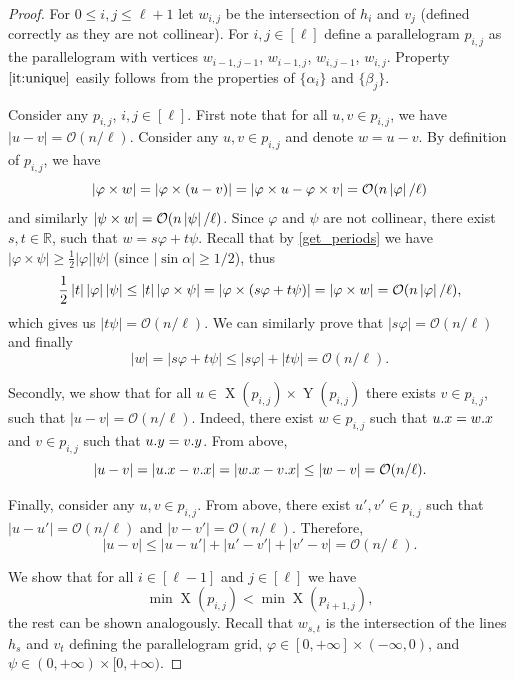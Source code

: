\documentclass[a4paper,11pt]{article}
\let\Cref\cref
\renewcommand{\O}{\mathcal{O}}
\renewcommand{\phi}{\varphi}
\DeclareMathOperator*{\X}{X}
\DeclareMathOperator*{\Y}{Y}
\newcommand{\absolute}[1]{\left\lvert#1\right\rvert}
\begin{document}
\begin{proof}
For $0 \le i,j \le \ell+1$ let $w_{i,j}$ be the intersection of $h_i$ and $v_j$ (defined correctly as they are not collinear). For $i,j \in [\ell]$ define a parallelogram $p_{i,j}$ as the parallelogram with vertices $w_{i-1,j-1}$, $w_{i-1,j}$, $w_{i,j-1}$, $w_{i,j}$. Property $\ref{it:unique}$ easily follows from the properties of $\{\alpha_i\}$ and $\{\beta_j\}$.

Consider any $p_{i,j}$, $i,j \in [\ell]$. First note that	for all $u, v \in p_{i, j}$, we have $\absolute{u - v} = \O(n / \ell)$. Consider any $u, v \in p_{i, j}$ and denote $w = u - v$.
By definition of $p_{i, j}$, we have
\[ \absolute{\h{w}} = \absolute{\h{(u - v)}} = \absolute{\h{u} - \h{v}} = \O(n\absolute{\phi} / \ell) \]
and similarly $\absolute{\s{w}} = \O(n\absolute{\psi} / \ell)$. Since $\phi$ and $\psi$ are not collinear, there exist $s, t \in \mathbb{R}$, such that $w = s\phi + t\psi$. Recall that by \Cref{get_periods} we have $\absolute{\phi \times \psi} \ge \frac{1}{2}\absolute{\phi}\absolute{\psi}$ (since $\absolute{\sin \alpha} \ge 1/2$), thus
\[ \frac{1}{2}\absolute{t}\absolute{\phi}\absolute{\psi} \le \absolute{t}\absolute{\phi \times \psi} = \absolute{\phi \times (s\phi + t\psi)} = \absolute{\h{w}} = \O(n\absolute{\phi} / \ell), \]
which gives us $\absolute{t\psi} = \O(n / \ell)$. We can similarly prove that $\absolute{s\phi} = \O(n / \ell)$ and finally 
\[ \absolute{w} = \absolute{s\phi + t\psi} \le \absolute{s\phi} + \absolute{t\psi} = \O(n / \ell). \]

Secondly, we show that	for all $u \in \X(p_{i, j}) \times \Y(p_{i, j})$ there exists $v \in p_{i, j}$, such that $\absolute{u - v} = \O(n / \ell)$. Indeed, there exist $w \in p_{i, j}$ such that $u.x = w.x$ and $v \in p_{i, j}$ such that $u.y = v.y$. From above, 
\[\absolute{u - v} = \absolute{\x{u} - \x{v}} = \absolute{\x{w} - \x{v}} \le \absolute{w - v} = \O(n / \ell).\] 

Finally, consider any $u, v \in p_{i, j}$. From above, there exist $u', v' \in p_{i, j}$ such that $\absolute{u - u'} = \O(n / \ell)$ and $\absolute{v - v'} = \O(n / \ell)$. Therefore, 
\[ \absolute{u - v} \le \absolute{u - u'} + \absolute{u' - v'} + \absolute{v' - v} = \O(n / \ell). \]

We show that for all $i \in [\ell - 1]$ and $j \in [\ell]$ we have
$$\min \X(p_{i, j}) < \min \X(p_{i + 1, j}),$$
the rest can be shown analogously. Recall that $w_{s,t}$ is the intersection of the lines $h_s$ and $v_t$ defining the parallelogram grid, $\phi \in [0, +\infty] \times (-\infty,0)$, and $\psi \in (0,+\infty) \times [0,+\infty)$. 


\end{proof}
\end{document}

